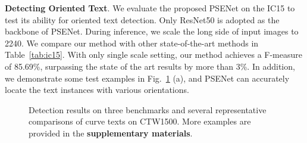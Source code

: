 \documentclass[10pt,twocolumn,letterpaper]{article}
\begin{document}
	\textbf{Detecting Oriented Text}. We evaluate the proposed PSENet on the IC15 to test its ability for oriented text detection. Only ResNet50 is adopted as the backbone of PSENet. During inference, we scale the long side of input images to 2240. We compare our method with other state-of-the-art methods in Table~\ref{tab:ic15}. With only single scale setting, our method achieves a F-measure of 85.69\%, surpassing the state of the art results by more than 3\%. In addition, we demonstrate some test examples in Fig.~\ref{fig:res} (a), and PSENet can accurately locate the text instances with various orientations.
	\begin{figure}[t]
		\centering
		\setlength{\fboxrule}{0pt}
		\caption{Detection results on three benchmarks and several representative comparisons of curve texts on CTW1500. More examples are provided in the \textbf{supplementary materials}.}
		\label{fig:res}
	\end{figure}
\end{document}
